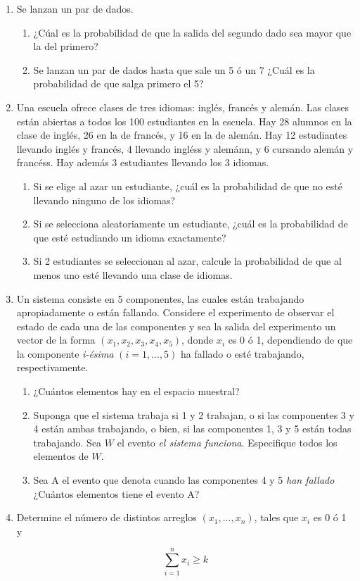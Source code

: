\begin{enumerate}
\item Se lanzan un par de dados. 
\begin{enumerate}
	\item ¿Cúal es la probabilidad de que la salida del segundo dado sea mayor que la del primero?
	\item Se lanzan un par de dados hasta que sale un 5 ó un 7 ¿Cuál es la probabilidad de que salga primero el 5?
\end{enumerate}

\item Una escuela ofrece clases de tres idiomas: inglés, francés y alemán. Las clases están abiertas a todos los 100 estudiantes en la escuela. Hay 28 alumnos en la clase de inglés, 26 en la de francés, y 16 en la de alemán. Hay 12 estudiantes llevando inglés y francés, 4 llevando ingléss y alemánn, y 6 cursando alemán y francéss. Hay además 3 estudiantes llevando los 3 idiomas.
\begin{enumerate}
	\item Si se elige al azar un estudiante, ¿cuál es la probabilidad de que no esté llevando ninguno de los idiomas?
	\item Si se selecciona aleatoriamente un estudiante, ¿cuál es la probabilidad de que esté estudiando un idioma exactamente?
	\item Si 2 estudiantes se seleccionan al azar, calcule la probabilidad de que al menos uno esté llevando una clase de idiomas.
\end{enumerate}

\item Un sistema consiste en 5 componentes, las cuales están trabajando apropiadamente o están fallando. Considere el experimento de observar el estado de cada una de las componentes y sea la salida del experimento un vector de la forma $(x_1,x_2,x_3,x_4,x_5)$, donde $x_i$ es 0 ó 1, dependiendo de que la componente \textit{i-ésima} $(i = 1, . . . , 5)$ ha fallado o esté trabajando, respectivamente.
\begin{enumerate}
	\item ¿Cuántos elementos hay en el espacio muestral?
	\item Suponga que el sistema trabaja si 1 y 2 trabajan, o si las componentes 3 y 4 están ambas trabajando, o bien, si las componentes 1, 3 y 5 están todas trabajando. Sea $W$ el evento \textit{el sistema funciona}. Especifique todos los elementos de $W$.
	\item Sea A el evento que denota cuando las componentes 4 y 5 \textit{han fallado} ¿Cuántos elementos tiene el evento A?
\end{enumerate}

\item Determine el número de distintos arreglos $(x_1, . . . , x_n)$, tales que $x_i$ es 0 ó 1 y

$$ \sum_{i=1}^{n} x_i \ge k $$
\end{enumerate}

